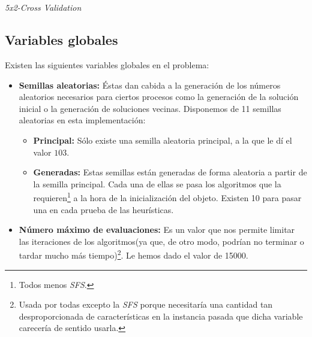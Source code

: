 \documentclass[a4paper, 11pt]{article}
\begin{document}
			\begin{algorithm}[H]
				\begin{algorithmic}[1]
					\REQUIRE \ \\
							 \
							 

										  		
					\ENDFOR
					
				\end{algorithmic}
			\caption{\textit{5x2-Cross Validation}}
			\label{Cross-Validation}
			\end{algorithm}			
			
		\subsection{Variables globales}
			Existen las siguientes variables globales en el problema:
			\begin{itemize}
				\item \textbf{Semillas aleatorias:} Éstas dan cabida a la generación de los números
				aleatorios necesarios para ciertos procesos como la generación de la solución inicial
				o la generación de soluciones vecinas. Disponemos de 11 semillas aleatorias en esta
				implementación:
					\begin{itemize}
						\item \textbf{Principal:} Sólo existe una semilla aleatoria principal, a la
						que le dí el valor $103$.
						\item \textbf{Generadas:} Estas semillas están generadas de forma aleatoria
						a partir de la semilla principal. Cada una de ellas se pasa los algoritmos
						que la requieren\footnote{Todos menos \textit{SFS}.} a la hora de la
						inicialización del objeto. Existen 10 para pasar una en cada prueba de las
						heurísticas.
					\end{itemize}
				\item \textbf{Número máximo de evaluaciones:} Es un valor que nos permite limitar
				las iteraciones de los algoritmos(ya que, de otro modo, podrían no terminar o tardar
				mucho más tiempo)\footnote{Usada por todas excepto la \textit{SFS} porque necesitaría
				una cantidad tan desproporcionada de características en la instancia pasada que
				dicha variable carecería de sentido usarla.}. Le hemos dado el valor de 15000.
			\end{itemize}
		
\end{document}
